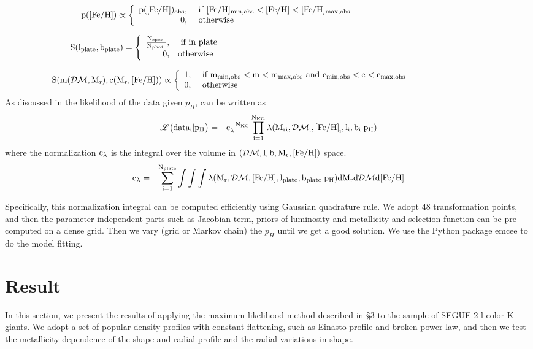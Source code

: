 \documentclass[12pt,preprint]{aastex}
\newcommand{\DM}{\mathcal{DM}}
\newcommand{\feh}{{\rm [Fe/H]}}
\newcommand{\lph}{\mathscr{L}\bigl({data_i}|p_H\bigr)}
\begin{document}
$$
\rm p(\feh) \propto \left\{ \begin{array}{rl}\rm p(\feh)_{obs}, &\mbox{ \rm if $\rm [Fe/H]_{min,obs}<\feh<[Fe/H]_{max,obs}$} ~~~~~~~~~~~~~~~~~~~~~~~~~~~~~~~~~~~\\
  0, &\mbox{ \rm otherwise}~~~~~~~~~~~~~~~~~~~~~~~~~~~~~~~~
       \end{array} \right.
$$

$$
\rm S(l_{plate},b_{plate})=\left\{ \begin{array}{rl}
 \rm \frac{\rm N_{spec.}}{\rm N_{phot.}}, &\mbox{ \rm if in plate} ~~~~~~~~~~~~~~~~~~~~~~~~~~~~~~~~~~~~~~~~~~~~~~~~~~~~~~~~~~~~~~~~~~~~~~~~~~~~~\\
  0, &\mbox{\rm otherwise}~~~~~~~~~~~~~~~~~~~~~~~~~~~~~~~~~~~~~~~~~~~~~~~~~~~~~~~~~~~~~~~~~~~~~~~~~~~~~~~~~~~~~~~
       \end{array} \right.
$$

$$
\rm S(m(\DM,M_r),c(M_r,\feh))\propto \left\{ \begin{array}{rl}
 1, &\mbox{ \rm if $\rm m_{min,obs}<m<m_{max,obs}$ and $\rm c_{min,obs}<c<c_{max,obs}$} ~~~~~~~~~~~~~~~~~~~~~~~~~~ \\
  0, &\mbox{ otherwise}~~~~~~~~~~~~~~~~~~~~~~~~~~~~~~~~~~~~~~~~~~~~~~~~~~~~~
       \end{array} \right.
$$
As discussed in \citet{Bovy2012} the likelihood of the data given $p_H$, can be written as
\begin{eqnarray}
\rm \lph &=& \rm c_{\lambda}^{-N_{KG}}\prod \limits_{i=1}^{N_{KG}}\lambda(M_{ri},\DM_i,\feh_i,l_i,b_i|p_H)
\end{eqnarray}
where the normalization $\rm c_\lambda$ is the integral over the volume in $\rm (\DM,l,b,M_r,\feh)$ space. 
\begin{eqnarray}
\rm c_\lambda&=&\rm \sum \limits_{i=1}^{N_{plate}} \int\int\int \lambda(M_r,\DM,\feh,l_{plate},b_{plate}|p_H)dM_rd \DM d \feh
\end{eqnarray}

Specifically, this normalization integral can be computed efficiently using Gaussian quadrature rule. We adopt 48 transformation points, and then the parameter-independent parts such as Jacobian term, priors of luminosity and metallicity and selection function can be pre-computed on a dense grid. Then we vary (grid or Markov chain) the $p_H$ until we get a good solution. We use the Python package emcee\citep{Foreman2013} to do the model fitting.

\section{Result}
In this section, we present the results of applying the maximum-likelihood method described in \S 3 to the sample of SEGUE-2 l-color K giants. We adopt a set of popular density profiles with constant flattening, such as Einasto profile and broken power-law, and then we test the metallicity dependence of the shape and radial profile and the radial variations in shape.
\end{document}
